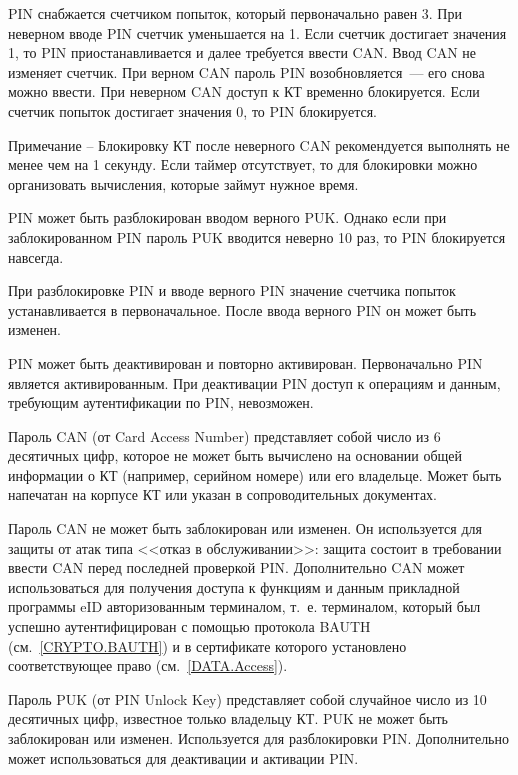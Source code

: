 PIN снабжается счетчиком попыток, который первоначально равен 3. При 
неверном вводе PIN счетчик уменьшается на 1. Если счетчик достигает 
значения 1, то PIN приостанавливается и далее требуется ввести CAN. 
Ввод CAN не изменяет счетчик. При верном CAN пароль PIN возобновляется~--- 
его снова можно ввести. При неверном CAN доступ к КТ временно блокируется. 
Если счетчик попыток достигает значения 0, то PIN блокируется. 

\begin{note}
Примечание -- Блокировку КТ после неверного CAN рекомендуется выполнять не 
менее чем на 1 секунду. Если таймер отсутствует, то для блокировки можно 
организовать вычисления, которые займут нужное время. 
\end{note}
\fi

PIN может быть разблокирован вводом верного PUK. Однако если при 
заблокированном PIN пароль PUK вводится неверно 10 раз, то PIN блокируется 
навсегда.

При разблокировке PIN и вводе верного PIN значение счетчика попыток 
устанавливается в первоначальное. После ввода верного PIN он  
может быть изменен. 

PIN может быть деактивирован и повторно активирован.
Первоначально PIN является активированным. При деактивации
PIN доступ к операциям и данным, требующим аутентификации по PIN, невозможен.

Пароль CAN (от Card Access Number) представляет собой число из 6 десятичных 
цифр, которое не может быть вычислено на основании общей информации о КТ 
(например, серийном номере) или его владельце. Может быть напечатан на корпусе 
КТ или указан в сопроводительных документах. 

Пароль CAN не может быть заблокирован или изменен. Он используется для защиты 
от атак типа <<отказ в обслуживании>>: защита состоит в требовании ввести CAN перед 
последней проверкой PIN. Дополнительно CAN может использоваться для 
получения доступа к функциям и данным прикладной программы eID 
авторизованным терминалом, т.~е. терминалом, который был успешно 
аутентифицирован с помощью протокола BAUTH (см.~\ref{CRYPTO.BAUTH}) и в 
сертификате которого установлено соответствующее право (см.~\ref{DATA.Access}). 

Пароль PUK (от PIN Unlock Key) представляет собой случайное число из 10 
десятичных цифр, известное только владельцу КТ. PUK не может быть заблокирован 
или изменен. Используется для разблокировки PIN. Дополнительно может использоваться 
для деактивации и активации PIN.

